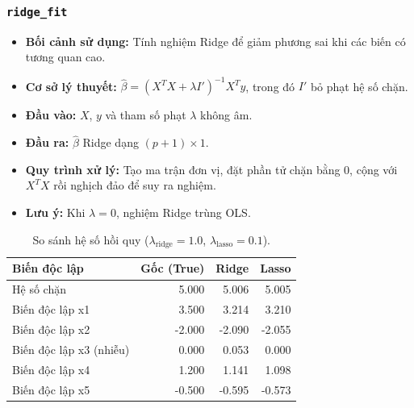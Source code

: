 \documentclass[a4paper]{article}
\newcommand{\code}[1]{\colorbox{light-gray}{\texttt{#1}}}
\begin{document}
\subsubsection{\code{ridge\_fit}}
\begin{itemize}[leftmargin=*]
    \item \textbf{Bối cảnh sử dụng:} Tính nghiệm Ridge để giảm phương sai khi các biến có tương quan cao.
    \item \textbf{Cơ sở lý thuyết:} $\hat{\beta}=(X^T X+\lambda I')^{-1}X^T y$, trong đó $I'$ bỏ phạt hệ số chặn.
    \item \textbf{Đầu vào:} $X$, $y$ và tham số phạt $\lambda$ không âm.
    \item \textbf{Đầu ra:} $\hat{\beta}$ Ridge dạng $(p+1)\times1$.
    \item \textbf{Quy trình xử lý:} Tạo ma trận đơn vị, đặt phần tử chặn bằng 0, cộng với $X^T X$ rồi nghịch đảo để suy ra nghiệm.
    \item \textbf{Lưu ý:} Khi $\lambda=0$, nghiệm Ridge trùng OLS.
\end{itemize}
\begin{table}[H]
    \centering
    \small
    \begin{tabular}{lrrr}
    \toprule
    \textbf{Biến độc lập} & \textbf{Gốc (True)} & \textbf{Ridge} & \textbf{Lasso} \\
    \midrule
    Hệ số chặn & 5.000 & 5.006 & 5.005 \\
    Biến độc lập x1 & 3.500 & 3.214 & 3.210 \\
    Biến độc lập x2 & -2.000 & -2.090 & -2.055 \\
    Biến độc lập x3 (nhiễu) & 0.000 & 0.053 & 0.000 \\
    Biến độc lập x4 & 1.200 & 1.141 & 1.098 \\
    Biến độc lập x5 & -0.500 & -0.595 & -0.573 \\
    \bottomrule
    \end{tabular}
    \caption{So sánh hệ số hồi quy ($\lambda_{\text{ridge}}=1.0$, $\lambda_{\text{lasso}}=0.1$).}
\end{table}
\end{document}
